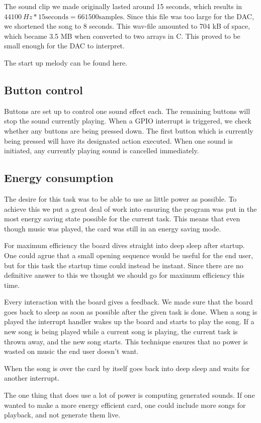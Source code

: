 The sound clip we made originally lasted around 15 seconds, which results in $\SI{44100}{Hz} * 15 \text{seconds} = 661500 \text{samples}$.
Since this file was too large for the DAC, we shortened the song to 8 seconds.
This wav-file amounted to 704 kB of space, which became 3.5 MB when converted to two arrays in C. This proved to be small enough for the DAC to interpret.

The start up melody can be found here. \cite{song}

\subsection{Button control}

Buttons are set up to control one sound effect each. The remaining buttons will stop the sound currently playing.
When a GPIO interrupt is triggered, we check whether any buttons are being pressed down.
The first button which is currently being pressed will have its designated action executed.
When one sound is initiated, any currently playing sound is cancelled immediately.

\subsection{Energy consumption}

The desire for this task was to be able to use as little power as possible.
To achieve this we put a great deal of work into ensuring the program was put in the most energy saving state possible for the current task.
This means that even though music was played, the card was still in an energy saving mode.

For maximum efficiency the board dives straight into deep sleep after startup.
One could agrue that a small opening sequence would be useful for the end user, but for this task the startup time could instead be instant.
Since there are no definitive answer to this we thought we should go for maximum efficiency this time.

Every interaction with the board gives a feedback.
We made sure that the board goes back to sleep as soon as possible after the given task is done.
When a song is played the interrupt handler wakes up the board and starts to play the song.
If a new song is being played while a current song is playing, the current task is thrown away, and the new song starts.
This technique ensures that no power is wasted on music the end user doesn't want.

When the song is over the card by itself goes back into deep sleep and waits for another interrupt.

The one thing that does use a lot of power is computing generated sounds.
If one wanted to make a more energy efficient card, one could include more songs for playback, and not generate them live.
